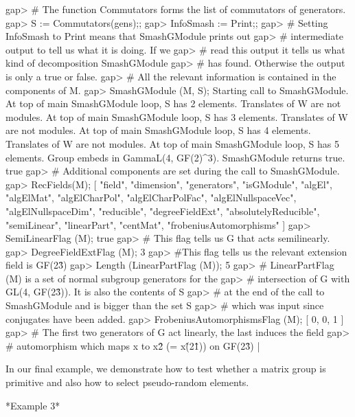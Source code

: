    gap> # The function Commutators forms the list of commutators of generators.
   gap> S := Commutators(gens);;
   gap> InfoSmash := Print;; 
   gap> # Setting InfoSmash to Print means that SmashGModule prints out  
   gap> # intermediate output to tell us what it is doing. If we 
   gap> # read this output it tells us what kind of decomposition SmashGModule
   gap> # has found. Otherwise the output is only a true or false.
   gap> # All the relevant information is contained in the components of M.
   gap> SmashGModule (M, S);
   Starting call to SmashGModule.
   At top of main SmashGModule loop, S has 2 elements.
   Translates of W are not modules.
   At top of main SmashGModule loop, S has 3 elements.
   Translates of W are not modules.
   At top of main SmashGModule loop, S has 4 elements.
   Translates of W are not modules.
   At top of main SmashGModule loop, S has 5 elements.
   Group embeds in GammaL(4, GF(2)^3).
   SmashGModule returns true.
   true
   gap> # Additional components are set during the call to SmashGModule.
   gap> RecFields(M);
   [ "field", "dimension", "generators", "isGModule", "algEl", "algElMat", 
     "algElCharPol", "algElCharPolFac", "algElNullspaceVec",
     "algElNullspaceDim",
     "reducible", "degreeFieldExt", "absolutelyReducible",
     "semiLinear", "linearPart", 
     "centMat", "frobeniusAutomorphisms" ]
   gap> SemiLinearFlag (M);
   true
   gap> # This flag tells us G that acts semilinearly.
   gap> DegreeFieldExtFlag (M);
   3
   gap> #This flag tells us the relevant extension field is GF(2\^3)
   gap> Length (LinearPartFlag (M));
   5
   gap> # LinearPartFlag (M) is a set of normal subgroup generators for the
   gap> # intersection of G with GL(4, GF(2\^3)). It is also the contents of S
   gap> # at the end of the call to SmashGModule and is bigger than the set S
   gap> # which was input since conjugates have been added.
   gap> FrobeniusAutomorphismsFlag (M);
   [ 0, 0, 1 ]
   gap> # The first two generators of G act linearly, the last induces the field
   gap> # automorphism which maps x to x\^2 (= x\^(2\^1)) on GF(2\^3) |

In our final example,  we demonstrate how  to test whether a matrix group
is primitive and also how to select pseudo-random elements.

*Example 3*

